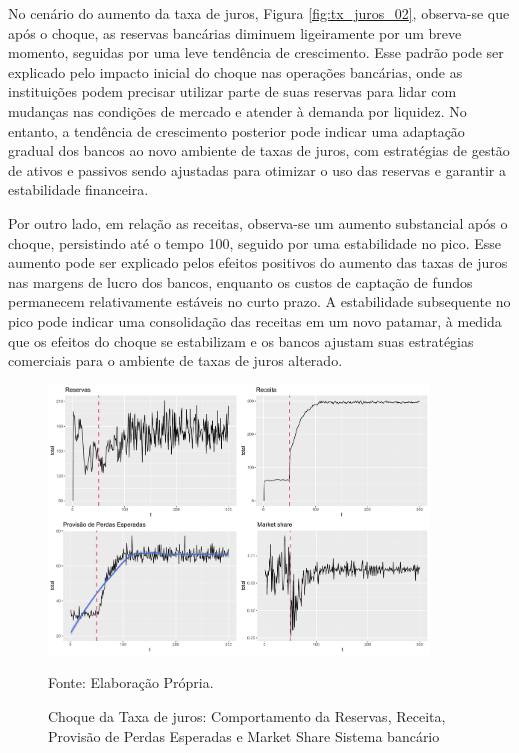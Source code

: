 \documentclass[hidelinks, article,12pt,oneside,a4paper,english,brazil,sumario=tradicional]{abntex2}
\begin{document}
No cenário do aumento da taxa de juros, Figura \ref{fig:tx_juros_02}, observa-se que após o choque, as reservas bancárias diminuem ligeiramente por um breve momento, seguidas por uma leve tendência de crescimento. Esse padrão pode ser explicado pelo impacto inicial do choque nas operações bancárias, onde as instituições podem precisar utilizar parte de suas reservas para lidar com mudanças nas condições de mercado e atender à demanda por liquidez. No entanto, a tendência de crescimento posterior pode indicar uma adaptação gradual dos bancos ao novo ambiente de taxas de juros, com estratégias de gestão de ativos e passivos sendo ajustadas para otimizar o uso das reservas e garantir a estabilidade financeira.

Por outro lado, em relação as receitas, observa-se um aumento substancial após o choque, persistindo até o tempo 100, seguido por uma estabilidade no pico. Esse aumento pode ser explicado pelos efeitos positivos do aumento das taxas de juros nas margens de lucro dos bancos, enquanto os custos de captação de fundos permanecem relativamente estáveis no curto prazo. A estabilidade subsequente no pico pode indicar uma consolidação das receitas em um novo patamar, à medida que os efeitos do choque se estabilizam e os bancos ajustam suas estratégias comerciais para o ambiente de taxas de juros alterado.


\begin{figure} [H]
\caption{Choque da Taxa de juros: Comportamento da Reservas, Receita, Provisão de Perdas Esperadas e Market Share Sistema bancário} \label{fig:tx_juros_02}
\centering %

\includegraphics[width=0.9\textwidth]{figs/juros_02.pdf}

Fonte: Elaboração Própria.
\label{fig:dec_var_fbcf}
\end{figure}
\end{document}
